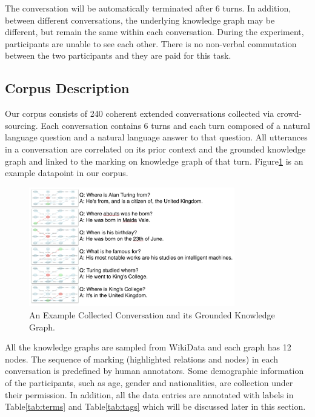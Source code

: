 \documentclass[bsc,frontabs,twoside,singlespacing,parskip,deptreport]{infthesis}     %
\begin{document}
The conversation will be automatically terminated after 6 turns. In addition, between different conversations, the underlying knowledge graph may be different, but remain the same within each conversation. During the experiment, participants are unable to see each other. There is no non-verbal commutation between the two participants and they are paid for this task.

\subsection{Corpus Description}

Our corpus consists of 240 coherent extended conversations collected via crowd-sourcing. Each conversation contains 6 turns and each turn composed of a natural language question and a natural language answer to that question. All utterances in a conversation are correlated on its prior context and the grounded knowledge graph and linked to the marking on knowledge graph of that turn. Figure\ref{fig:exampledata} is an example datapoint in our corpus.

\begin{figure}[h]
    \centering
    \includegraphics[width=0.8\textwidth]{eaxmppledata.png}
    \caption{An Example Collected Conversation and its Grounded Knowledge Graph.}
    \label{fig:exampledata}
\end{figure}

All the knowledge graphs are sampled from WikiData\cite{vrandevcic2014wikidata} and each graph has 12 nodes. The sequence of marking (highlighted relations and nodes) in each conversation is predefined by human annotators. Some demographic information of the participants, such as age, gender and nationalities, are collection under their permission. In addition, all the data entries are annotated with labels in Table\ref{tab:terms} and Table\ref{tab:tags} which will be discussed later in this section.
\end{document}
